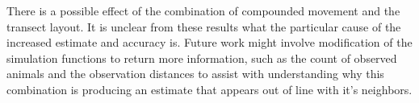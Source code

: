 \documentclass[12pt]{article}
\begin{document}
There is a possible effect of the combination of compounded movement and the transect layout. It is unclear from these results what the particular cause of the increased estimate and accuracy is. Future work might involve modification of the simulation functions to return more information, such as the count of observed animals and the observation distances to assist with understanding why this combination is producing an estimate that appears out of line with it's neighbors.



\printbibliography
%
%
\end{document}
